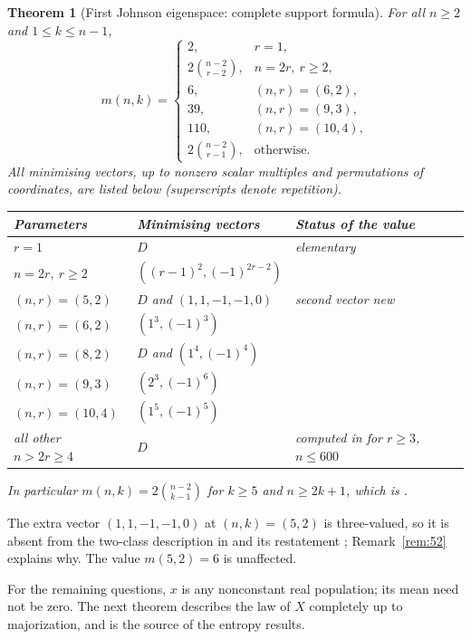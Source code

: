 \documentclass[11pt]{article}
\newtheorem{theorem}{Theorem}[section]
\theoremstyle{remark}
\begin{document}
\begin{theorem}[First Johnson eigenspace: complete support formula]\label{thm:support}
For all \(n\ge2\) and \(1\le k\le n-1\),
\[
 m(n,k)=
 \begin{cases}
 2,&r=1,\\
 2\binom{n-2}{r-2},&n=2r,\ r\ge2,\\
 6,&(n,r)=(6,2),\\
 39,&(n,r)=(9,3),\\
 110,&(n,r)=(10,4),\\
 2\binom{n-2}{r-1},&\text{otherwise}.
 \end{cases}
\]
All minimising vectors, up to nonzero scalar multiples and permutations of
coordinates, are listed below (superscripts denote repetition).
\begin{center}
\begin{tabular}{@{}lll@{}}
\toprule
Parameters & Minimising vectors & Status of the value\\
\midrule
\(r=1\) & \(D\) & elementary\\
\(n=2r,\ r\ge2\) & \(((r-1)^2,(-1)^{2r-2})\) & \cite[Section 5]{MVV}\\
\((n,r)=(5,2)\) & \(D\) and \((1,1,-1,-1,0)\) & second vector new\\
\((n,r)=(6,2)\) & \((1^3,(-1)^3)\) & \cite{MVV}\\
\((n,r)=(8,2)\) & \(D\) and \((1^4,(-1)^4)\) & \cite{MVV}\\
\((n,r)=(9,3)\) & \((2^3,(-1)^6)\) & \cite{MVV}\\
\((n,r)=(10,4)\) & \((1^5,(-1)^5)\) & \cite{MVV}\\
all other \(n>2r\ge4\) & \(D\) & computed in \cite{MVV} for \(r\ge3\), \(n\le600\)\\
\bottomrule
\end{tabular}
\end{center}
In particular \(m(n,k)=2\binom{n-2}{k-1}\) for \(k\ge5\) and \(n\ge2k+1\),
which is \cite[Conjecture~1]{MVV}.
\end{theorem}

The extra vector \((1,1,-1,-1,0)\) at \((n,k)=(5,2)\) is three-valued, so it is
absent from the two-class description in \cite[Theorem~1]{MVV} and its
restatement \cite[Theorem~5]{SV}; Remark~\ref{rem:52} explains why. The value
\(m(5,2)=6\) is unaffected.

For the remaining questions, \(x\) is any nonconstant real population; its
mean need not be zero. The next theorem describes the law of \(X\) completely
up to majorization, and is the source of the entropy results.
\end{document}
